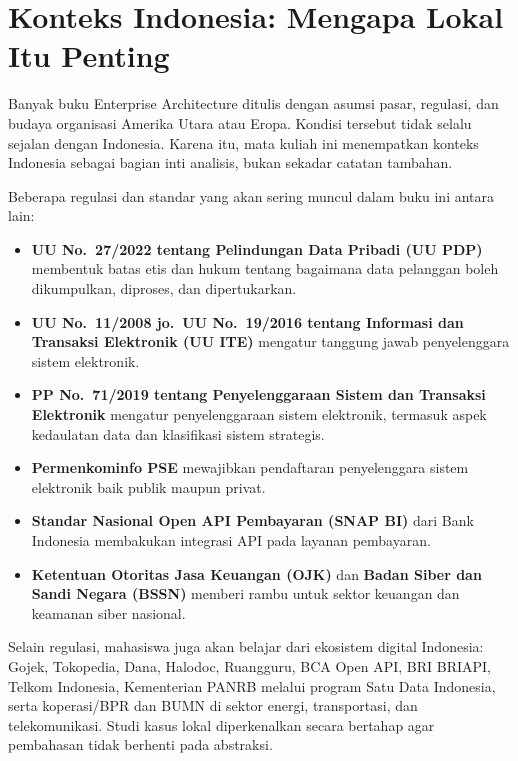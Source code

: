 \section{Konteks Indonesia: Mengapa Lokal Itu Penting}

Banyak buku Enterprise Architecture ditulis dengan asumsi pasar, regulasi, dan
budaya organisasi Amerika Utara atau Eropa. Kondisi tersebut tidak selalu
sejalan dengan Indonesia. Karena itu, mata kuliah ini menempatkan konteks
Indonesia sebagai bagian inti analisis, bukan sekadar catatan tambahan.

Beberapa regulasi dan standar yang akan sering muncul dalam buku ini antara
lain:

\begin{itemize}
  \item \textbf{UU No.~27/2022 tentang Pelindungan Data Pribadi (UU PDP)}
        membentuk batas etis dan hukum tentang bagaimana data pelanggan boleh
        dikumpulkan, diproses, dan dipertukarkan.
  \item \textbf{UU No.~11/2008 jo.~UU No.~19/2016 tentang Informasi dan
        Transaksi Elektronik (UU ITE)} mengatur tanggung jawab penyelenggara
        sistem elektronik.
  \item \textbf{PP No.~71/2019 tentang Penyelenggaraan Sistem dan Transaksi
        Elektronik} mengatur penyelenggaraan sistem elektronik, termasuk
        aspek kedaulatan data dan klasifikasi
        sistem strategis.
  \item \textbf{Permenkominfo PSE} mewajibkan pendaftaran penyelenggara sistem
        elektronik baik publik maupun privat.
  \item \textbf{Standar Nasional Open API Pembayaran (SNAP BI)} dari Bank
        Indonesia membakukan integrasi API pada layanan pembayaran.
  \item \textbf{Ketentuan Otoritas Jasa Keuangan (OJK)} dan \textbf{Badan Siber
        dan Sandi Negara (BSSN)} memberi rambu untuk sektor keuangan dan
        keamanan siber nasional.
\end{itemize}

Selain regulasi, mahasiswa juga akan belajar dari ekosistem digital Indonesia:
Gojek, Tokopedia, Dana, Halodoc, Ruangguru, BCA Open API, BRI BRIAPI, Telkom
Indonesia, Kementerian PANRB melalui program Satu Data Indonesia, serta
koperasi/BPR dan BUMN di sektor energi, transportasi, dan telekomunikasi.
Studi kasus lokal diperkenalkan secara bertahap agar pembahasan tidak berhenti
pada abstraksi.

